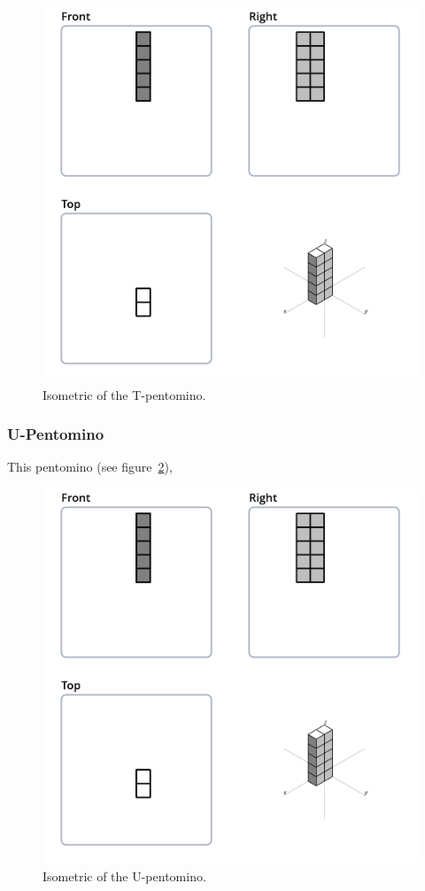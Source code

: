 \begin{figure}
	\centering
	\includegraphics[scale=0.3]{iso_diagrams/o.png}
	\caption{Isometric of the T-pentomino.}
  \label{fig:iso-pent-t}
\end{figure}

\subsubsection{U-Pentomino}
\label{sec:u-pentomino}
This pentomino (see figure~\ref{fig:iso-pent-u}),


\begin{figure}
	\centering
	\includegraphics[scale=0.3]{iso_diagrams/o.png}
	\caption{Isometric of the U-pentomino.}
  \label{fig:iso-pent-u}
\end{figure}
